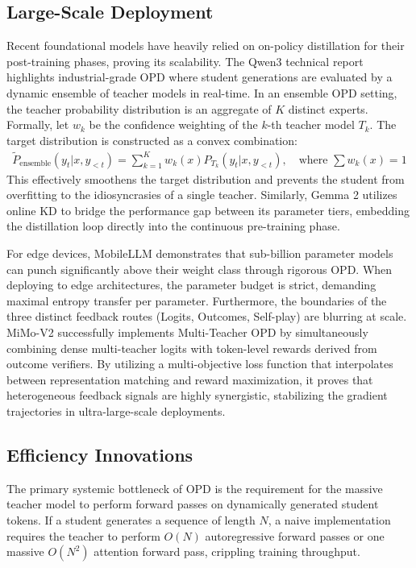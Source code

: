 \subsection{Large-Scale Deployment}
Recent foundational models have heavily relied on on-policy distillation for their post-training phases, proving its scalability. The Qwen3 technical report \citep{2505.09388} highlights industrial-grade OPD where student generations are evaluated by a dynamic ensemble of teacher models in real-time. In an ensemble OPD setting, the teacher probability distribution is an aggregate of $K$ distinct experts. Formally, let $w_k$ be the confidence weighting of the $k$-th teacher model $T_k$. The target distribution is constructed as a convex combination:
\begin{align}
\tilde{P}_{\text{ensemble}}(y_t | x, y_{<t}) = \sum_{k=1}^K w_k(x) P_{T_k}(y_t | x, y_{<t}), \quad \text{where } \sum w_k(x) = 1
\end{align}
This effectively smoothens the target distribution and prevents the student from overfitting to the idiosyncrasies of a single teacher. Similarly, Gemma 2 \citep{2406.06608} utilizes online KD to bridge the performance gap between its parameter tiers, embedding the distillation loop directly into the continuous pre-training phase. 

For edge devices, MobileLLM \citep{2509.24945} demonstrates that sub-billion parameter models can punch significantly above their weight class through rigorous OPD. When deploying to edge architectures, the parameter budget is strict, demanding maximal entropy transfer per parameter. Furthermore, the boundaries of the three distinct feedback routes (Logits, Outcomes, Self-play) are blurring at scale. MiMo-V2 \citep{2601.02780} successfully implements Multi-Teacher OPD by simultaneously combining dense multi-teacher logits with token-level rewards derived from outcome verifiers. By utilizing a multi-objective loss function that interpolates between representation matching and reward maximization, it proves that heterogeneous feedback signals are highly synergistic, stabilizing the gradient trajectories in ultra-large-scale deployments.

\subsection{Efficiency Innovations}
The primary systemic bottleneck of OPD is the requirement for the massive teacher model to perform forward passes on dynamically generated student tokens. If a student generates a sequence of length $N$, a naive implementation requires the teacher to perform $O(N)$ autoregressive forward passes or one massive $O(N^2)$ attention forward pass, crippling training throughput. 

